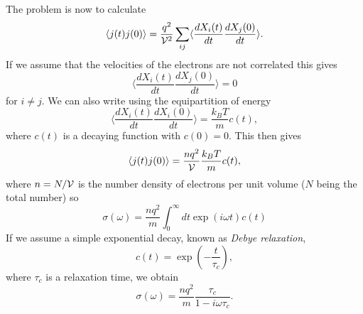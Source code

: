\documentclass[11pt]{report}
\begin{document}
The problem is now to calculate
\begin{equation}
\langle j(t)j(0)\rangle = \frac{q^2}{{\cal V}^2} \sum_{ij} \langle \frac{dX_i(t)}{dt}\frac{dX_j(0)}{dt}\rangle .
\end{equation}
If we assume that the velocities of the electrons are not correlated this gives
\begin{equation}
\langle \frac{dX_i(t)}{dt}\frac{dX_j(0)}{dt}\rangle =0
\end{equation}
for $i\neq j$. We can also write using the equipartition of energy
\begin{equation}
\langle \frac{dX_i(t)}{dt}\frac{dX_i(0)}{dt}\rangle =\frac{k_B T}{m} c(t),
\end{equation}
where $c(t)$ is a decaying function with $c(0)=0$. This then gives
\begin{equation}
\langle j(t)j(0)\rangle = \frac{nq^2}{{\cal V}} \frac{k_B T}{m} c(t) ,
\end{equation}
where $n = N/{\cal V}$ is the number density of electrons per unit volume ($N$ being the total number) so
\begin{equation}
\sigma(\omega) = \frac{nq^2}{m}\int_0^\infty dt \exp(i\omega t) c(t)
\end{equation}
If we assume a simple exponential decay, known as {\em Debye relaxation},
\begin{equation}
c(t) =\exp(-\frac{t}{\tau_c}),
\end{equation}
where $\tau_c$ is a relaxation time, we obtain
\begin{equation}
\sigma(\omega) = \frac{nq^2}{m}\frac{\tau_c}{1-i\omega\tau_c}.
\end{equation}
\end{document}
